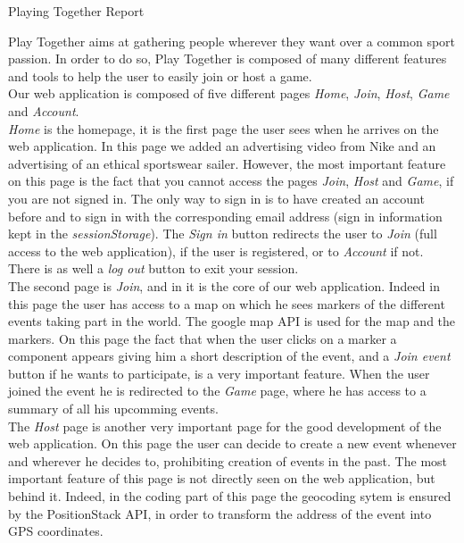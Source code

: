 \documentclass[]{article}
\begin{document}
\begin{center}
	\begin{huge}
	Playing Together Report
	\end{huge}
\end{center}
\vskip 0.5cm

Play Together aims at gathering people wherever they want over a common sport passion. In order to do so, Play Together is composed of many different features and tools to help the user to easily join or host a game.\\
Our web application is composed of five different pages \textit{Home}, \textit{Join}, \textit{Host}, \textit{Game} and \textit{Account}.\\ 

\textit{Home} is the homepage, it is the first page the user sees when he arrives on the web application. 
In this page we added an advertising video from Nike and an advertising of an ethical sportswear sailer. However, the most important feature on this page is the fact that you cannot access the pages \textit{Join}, \textit{Host} and \textit{Game}, if you are not signed in. The only way to sign in is to have created an account before and to sign in with the corresponding email address (sign in information kept in the \textit{sessionStorage}). The \textit{Sign in} button redirects the user to \textit{Join} (full access to the web application), if the user is registered, or to \textit{Account} if not. There is as well a \textit{log out} button to exit your session.\\

The second page is \textit{Join}, and in it is the core of our web application. Indeed in this page the user has access to a map on which he sees markers of the different events taking part in the world. The google map API is used for the map and the markers. On this page the fact that  when the user clicks on a marker a component appears giving him a short description of the event, and a \textit{Join event} button if he wants to participate, is a very important feature. When the user joined the event he is redirected to the \textit{Game} page, where he has access to a summary of all his upcomming events.\\

The \textit{Host} page is another very important page for the good development of the web application. On this page the user can decide to create a new event whenever and wherever he decides to, prohibiting creation of events in the past. The most important feature of this page is not directly seen on the web application, but behind it. Indeed, in the coding part of this page the geocoding sytem is ensured by the PositionStack API, in order to transform the address of the event into GPS coordinates.\\
\end{document}
